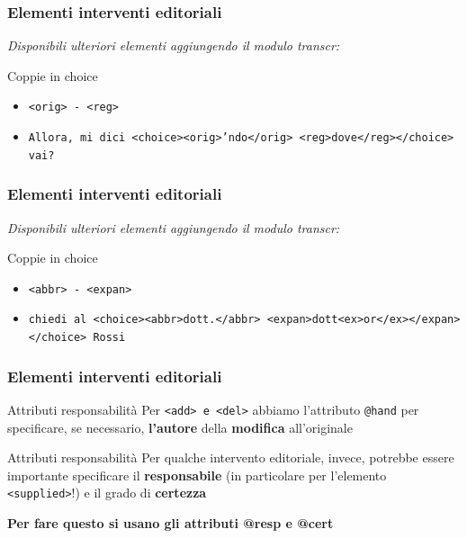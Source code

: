 \begin{frame}
    \frametitle{Elementi interventi editoriali}
    \addtocounter{nframe}{1}
    
    \textit{Disponibili ulteriori elementi aggiungendo il modulo transcr:}
    \begin{block}{Coppie in choice}
        \begin{itemize}
            \item \texttt{<orig> - <reg>} 
            \item[] \texttt{Allora, mi dici <choice><orig>’ndo</orig> <reg>dove</reg></choice> vai?}
        \end{itemize}
        
    \end{block}
    
\end{frame}

\begin{frame}
    \frametitle{Elementi interventi editoriali}
    \addtocounter{nframe}{1}
    
    \textit{Disponibili ulteriori elementi aggiungendo il modulo transcr:}
    \begin{block}{Coppie in choice}
        \begin{itemize}
            \item \texttt{<abbr> - <expan>} 
            \item[] \texttt{chiedi al <choice><abbr>dott.</abbr> <expan>dott<ex>or</ex></expan></choice> Rossi}
        \end{itemize}
        
    \end{block}
    
\end{frame}

\begin{frame}
    \frametitle{Elementi interventi editoriali}
    \addtocounter{nframe}{1}
    

    \begin{block}{Attributi responsabilità}
        Per \texttt{<add> e <del>} abbiamo l’attributo \texttt{@hand} per specificare, se necessario, \textbf{l’autore} della \textbf{modifica} all’originale
    \end{block}
    \begin{block}{Attributi responsabilità}
        Per qualche intervento editoriale, invece, potrebbe essere importante specificare il \textbf{responsabile} (in particolare per l’elemento \texttt{<supplied>}!) e il grado di \textbf{certezza}
    \end{block}
    \textbf{Per fare questo si usano gli attributi @resp e @cert}
\end{frame}



